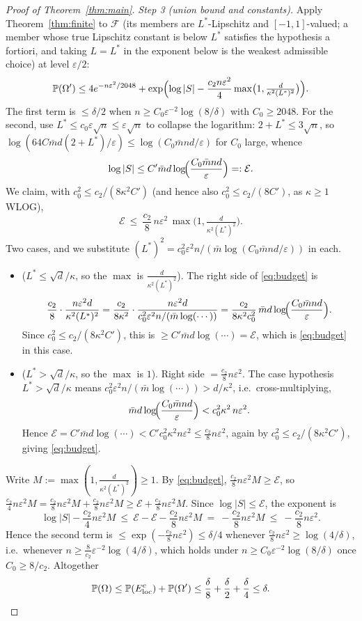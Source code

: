 \documentclass[11pt,reqno]{amsart}
\theoremstyle{plain}
\theoremstyle{definition}
\theoremstyle{remark}
\newcommand{\PP}{\mathbb{P}}
\newcommand{\eps}{\varepsilon}
\newcommand{\FF}{\mathcal{F}}
\begin{document}
\begin{proof}[Proof of Theorem~\textup{\ref{thm:main}}]
\emph{Step 3 (union bound and constants).} Apply Theorem~\ref{thm:finite} to $\FF$ (its members are $L^\ast$-Lipschitz and $[-1,1]$-valued; a member whose true Lipschitz constant is below $L^\ast$ satisfies the hypothesis a fortiori, and taking $L=L^\ast$ in the exponent below is the weakest admissible choice) at level $\eps/2$:
\[
\PP(\Omega')\le 4e^{-n\eps^2/2048}+\exp\Bigl(\log|S|-\frac{c_2n\eps^2}{4}\max\bigl(1,\tfrac{d}{\kappa^2(L^\ast)^2}\bigr)\Bigr).
\]
The first term is $\le\delta/2$ when $n\ge C_0\eps^{-2}\log(8/\delta)$ with $C_0\ge2048$. For the second, use $L^\ast\le c_0\eps\sqrt n\le\eps\sqrt n$ to collapse the logarithm: $2+L^\ast\le3\sqrt n$, so $\log(64C\bar md(2+L^\ast)/\eps)\le\log(C_0\bar mnd/\eps)$ for $C_0$ large, whence
\[
\log|S|\le C'\bar md\log\!\Bigl(\frac{C_0\bar mnd}{\eps}\Bigr)=:\mathcal E .
\]
We claim, with $c_0^2\le c_2/(8\kappa^2C')$ (and hence also $c_0^2\le c_2/(8C')$, as $\kappa\ge1$ WLOG),
\begin{equation}\label{eq:budget}
\mathcal E\ \le\ \frac{c_2}{8}\,n\eps^2\,\max\bigl(1,\tfrac{d}{\kappa^2(L^\ast)^2}\bigr).
\end{equation}
Two cases, and we substitute $(L^\ast)^2=c_0^2\eps^2 n/(\bar m\log(C_0\bar mnd/\eps))$ in each.
\begin{itemize}
\item[\emph{Case A}] ($L^\ast\le\sqrt d/\kappa$, so the $\max$ is $\tfrac d{\kappa^2(L^\ast)^2}$). The right side of \eqref{eq:budget} is
\[
\frac{c_2}{8}\cdot\frac{n\eps^2 d}{\kappa^2(L^\ast)^2}=\frac{c_2}{8\kappa^2}\cdot\frac{n\eps^2 d}{c_0^2\eps^2 n/(\bar m\log(\cdots))}=\frac{c_2}{8\kappa^2 c_0^2}\,\bar md\log\!\Bigl(\frac{C_0\bar mnd}{\eps}\Bigr).
\]
Since $c_0^2\le c_2/(8\kappa^2C')$, this is $\ge C'\bar md\log(\cdots)=\mathcal E$, which is \eqref{eq:budget} in this case.
\item[\emph{Case B}] ($L^\ast>\sqrt d/\kappa$, so the $\max$ is $1$). Right side $=\tfrac{c_2}8 n\eps^2$. The case hypothesis $L^\ast>\sqrt d/\kappa$ means $c_0^2\eps^2 n/(\bar m\log(\cdots))>d/\kappa^2$, i.e.\ cross-multiplying,
\[
\bar md\log\!\Bigl(\frac{C_0\bar mnd}{\eps}\Bigr)<c_0^2\kappa^2\,n\eps^2 .
\]
Hence $\mathcal E=C'\bar md\log(\cdots)<C'c_0^2\kappa^2 n\eps^2\le\tfrac{c_2}8 n\eps^2$, again by $c_0^2\le c_2/(8\kappa^2C')$, giving \eqref{eq:budget}.
\end{itemize}
Write $M:=\max(1,\tfrac d{\kappa^2(L^\ast)^2})\ge1$. By \eqref{eq:budget}, $\tfrac{c_2}8 n\eps^2 M\ge\mathcal E$, so $\tfrac{c_2}4 n\eps^2 M=\tfrac{c_2}8 n\eps^2 M+\tfrac{c_2}8 n\eps^2 M\ge\mathcal E+\tfrac{c_2}8 n\eps^2 M$. Since $\log|S|\le\mathcal E$, the exponent is
\[
\log|S|-\frac{c_2}4 n\eps^2 M\ \le\ \mathcal E-\mathcal E-\frac{c_2}8 n\eps^2 M\ =\ -\frac{c_2}8 n\eps^2 M\ \le\ -\frac{c_2}8 n\eps^2 .
\]
Hence the second term is $\le\exp(-\tfrac{c_2}8 n\eps^2)\le\delta/4$ whenever $\tfrac{c_2}8 n\eps^2\ge\log(4/\delta)$, i.e.\ whenever $n\ge\tfrac8{c_2}\eps^{-2}\log(4/\delta)$, which holds under $n\ge C_0\eps^{-2}\log(8/\delta)$ once $C_0\ge8/c_2$. Altogether
\[
\PP(\Omega)\le\PP(E_{\mathrm{loc}}^c)+\PP(\Omega')\le\frac\delta8+\frac\delta2+\frac\delta4\le\delta.\qedhere
\]
\end{proof}
\end{document}

